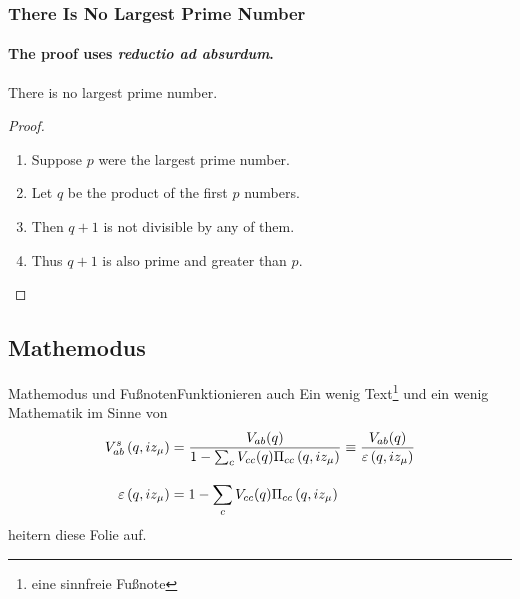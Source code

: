 \documentclass[utf8]{beamer}
\begin{document}
\begin{frame}
  \frametitle{There Is No Largest Prime Number}
  \framesubtitle{The proof uses \textit{reductio ad absurdum}.}
  \begin{theorem}
    There is no largest prime number.
  \end{theorem}
  \begin{proof}
    \begin{enumerate}
    \item<1-| alert@1> Suppose $p$ were the largest prime number.
    \item<2-> Let $q$ be the product of the first $p$ numbers.
    \item<3-> Then $q+1$ is not divisible by any of them.
    \item<1-> Thus $q+1$ is also prime and greater than $p$.\qedhere
    \end{enumerate}
  \end{proof}
\end{frame}


\subsection{Mathemodus}
\begin{frame}{Mathemodus und Fu{\ss}noten}{Funktionieren auch}
  Ein wenig Text\footnote{eine sinnfreie Fu{\ss}note} und ein wenig Mathematik im Sinne von
   \begin{align}
        V_{ab}^s\left(q, i z_\mu\right)
              &= \frac{V_{ab}(q)}{1-\sum_{c}V_{cc}(q)\Pi_{cc}\left(q, i z_\mu\right)} 
              \equiv \frac{V_{ab}(q)}{\varepsilon\left(q, i z_\mu\right)}  \\
          \rule{0pt}{2em}\varepsilon\left(q, iz_\mu\right) 
              &= 1-\sum_c V_{cc}(q)\Pi_{cc}\left(q, i z_\mu\right)
   \end{align}
   heitern diese Folie auf.
\end{frame}
\end{document}
